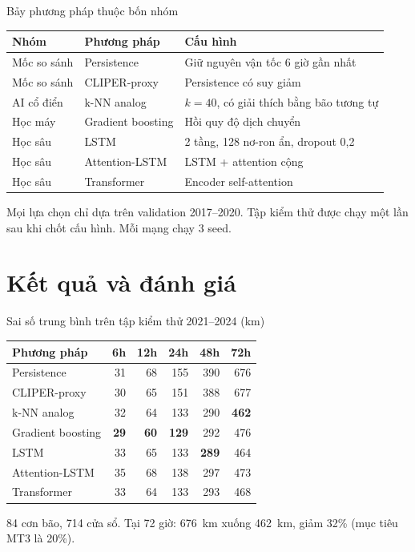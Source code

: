 \documentclass[aspectratio=169, 11pt]{beamer}
\begin{document}
\begin{frame}{Bảy phương pháp thuộc bốn nhóm}
  \centering
  \begin{tabular}{lll}
    \toprule
    \textbf{Nhóm} & \textbf{Phương pháp} & \textbf{Cấu hình} \\
    \midrule
    Mốc so sánh & Persistence       & Giữ nguyên vận tốc 6 giờ gần nhất \\
    Mốc so sánh & CLIPER-proxy      & Persistence có suy giảm \\
    AI cổ điển  & k-NN analog       & $k = 40$, có giải thích bằng bão tương tự \\
    Học máy     & Gradient boosting & Hồi quy độ dịch chuyển \\
    Học sâu     & LSTM              & 2 tầng, 128 nơ-ron ẩn, dropout 0,2 \\
    Học sâu     & Attention-LSTM    & LSTM + attention cộng \\
    Học sâu     & Transformer       & Encoder self-attention \\
    \bottomrule
  \end{tabular}

  \vspace{0.6em}
  \raggedright
  Mọi lựa chọn chỉ dựa trên validation 2017--2020. Tập kiểm thử được chạy
  \alert{một lần} sau khi chốt cấu hình. Mỗi mạng chạy 3 seed.
\end{frame}

\section{Kết quả và đánh giá}

\begin{frame}{Sai số trung bình trên tập kiểm thử 2021--2024 (km)}
  \centering
  \begin{tabular}{lrrrrr}
    \toprule
    \textbf{Phương pháp} & \textbf{6h} & \textbf{12h} & \textbf{24h} & \textbf{48h} & \textbf{72h} \\
    \midrule
    Persistence       & 31 & 68 & 155 & 390 & 676 \\
    CLIPER-proxy      & 30 & 65 & 151 & 388 & 677 \\
    k-NN analog       & 32 & 64 & 133 & 290 & \textbf{462} \\
    Gradient boosting & \textbf{29} & \textbf{60} & \textbf{129} & 292 & 476 \\
    LSTM              & 33 & 65 & 133 & \textbf{289} & 464 \\
    Attention-LSTM    & 35 & 68 & 138 & 297 & 473 \\
    Transformer       & 33 & 64 & 133 & 293 & 468 \\
    \bottomrule
  \end{tabular}

  \vspace{0.6em}
  \raggedright
  84 cơn bão, 714 cửa sổ. Tại 72 giờ: \alert{676~km xuống 462~km, giảm 32\%}
  (mục tiêu MT3 là 20\%).
\end{frame}
\end{document}
